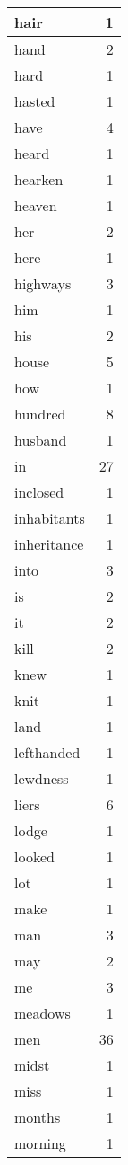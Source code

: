 \begin{center}
\begin{longtable}{l|r}
hair & 1 \\ \hline
hand & 2 \\ \hline
hard & 1 \\ \hline
hasted & 1 \\ \hline
have & 4 \\ \hline
heard & 1 \\ \hline
hearken & 1 \\ \hline
heaven & 1 \\ \hline
her & 2 \\ \hline
here & 1 \\ \hline
highways & 3 \\ \hline
him & 1 \\ \hline
his & 2 \\ \hline
house & 5 \\ \hline
how & 1 \\ \hline
hundred & 8 \\ \hline
husband & 1 \\ \hline
in & 27 \\ \hline
inclosed & 1 \\ \hline
inhabitants & 1 \\ \hline
inheritance & 1 \\ \hline
into & 3 \\ \hline
is & 2 \\ \hline
it & 2 \\ \hline
kill & 2 \\ \hline
knew & 1 \\ \hline
knit & 1 \\ \hline
land & 1 \\ \hline
lefthanded & 1 \\ \hline
lewdness & 1 \\ \hline
liers & 6 \\ \hline
lodge & 1 \\ \hline
looked & 1 \\ \hline
lot & 1 \\ \hline
make & 1 \\ \hline
man & 3 \\ \hline
may & 2 \\ \hline
me & 3 \\ \hline
meadows & 1 \\ \hline
men & 36 \\ \hline
midst & 1 \\ \hline
miss & 1 \\ \hline
months & 1 \\ \hline
morning & 1 \\ \hline

\end{longtable}
\end{center}
